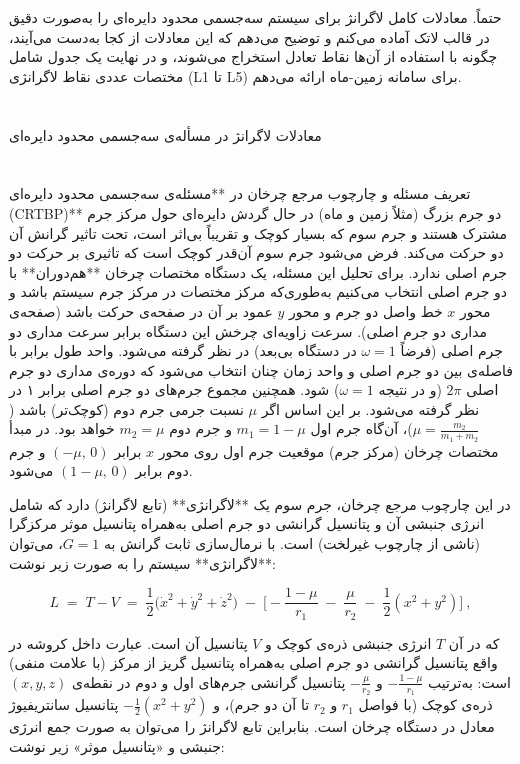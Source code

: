 حتماً. معادلات کامل لاگرانژ برای سیستم سه‌جسمی محدود دایره‌ای را به‌صورت دقیق در قالب لاتک آماده می‌کنم و توضیح می‌دهم که این معادلات از کجا به‌دست می‌آیند، چگونه با استفاده از آن‌ها نقاط تعادل استخراج می‌شوند، و در نهایت یک جدول شامل مختصات عددی نقاط لاگرانژی (L1 تا L5) برای سامانه زمین-ماه ارائه می‌دهم.

\section{} معادلات لاگرانژ در مسأله‌ی سه‌جسمی محدود دایره‌ای

\section{} تعریف مسئله و چارچوب مرجع چرخان  
در **مسئله‌ی سه‌جسمی محدود دایره‌ای (CRTBP)** دو جرم بزرگ (مثلاً زمین و ماه) در حال گردش دایره‌ای حول مرکز جرم مشترک هستند و جرم سوم که بسیار کوچک و تقریباً بی‌اثر است، تحت تاثیر گرانش آن دو حرکت می‌کند. فرض می‌شود جرم سوم آن‌قدر کوچک است که تاثیری بر حرکت دو جرم اصلی ندارد. برای تحلیل این مسئله، یک دستگاه مختصات چرخان **هم‌دوران** با دو جرم اصلی انتخاب می‌کنیم به‌طوری‌که مرکز مختصات در مرکز جرم سیستم باشد و محور $x$ خط واصل دو جرم و محور $y$ عمود بر آن در صفحه‌ی حرکت باشد (صفحه‌ی مداری دو جرم اصلی). سرعت زاویه‌ای چرخش این دستگاه برابر سرعت مداری دو جرم اصلی (فرضاً $\omega=1$ در دستگاه بی‌بعد) در نظر گرفته می‌شود. واحد طول برابر با فاصله‌ی بین دو جرم اصلی و واحد زمان چنان انتخاب می‌شود که دوره‌ی مداری دو جرم اصلی $2\pi$ (و در نتیجه $\omega=1$) شود. همچنین مجموع جرم‌های دو جرم اصلی برابر ۱ در نظر گرفته می‌شود. بر این اساس اگر $\mu$ نسبت جرمی جرم دوم (کوچک‌تر) باشد ($\mu=\frac{m_2}{m_1+m_2}$)، آن‌گاه جرم اول $m_1=1-\mu$ و جرم دوم $m_2=\mu$ خواهد بود. در مبدأ مختصات چرخان (مرکز جرم) موقعیت جرم اول روی محور $x$ برابر $(-\mu,\,0)$ و جرم دوم برابر $(1-\mu,\,0)$ می‌شود.  

در این چارچوب مرجع چرخان، جرم سوم یک **لاگرانژی** (تابع لاگرانژ) دارد که شامل انرژی جنبشی آن و پتانسیل گرانشی دو جرم اصلی به‌همراه پتانسیل موثر مرکزگرا (ناشی از چارچوب غیرلخت) است. با نرمال‌سازی ثابت گرانش به $G=1$، می‌توان **لاگرانژی** سیستم را به صورت زیر نوشت:

$$ 
L \;=\; T - V \;=\; \frac{1}{2}\Big(\dot{x}^2+\dot{y}^2+\dot{z}^2\Big)\;-\;\Bigg[-\frac{1-\mu}{r_1}\;-\;\frac{\mu}{r_2}\;-\;\frac{1}{2}(x^2+y^2)\Bigg]~, 
$$

که در آن $T$ انرژی جنبشی ذره‌ی کوچک و $V$ پتانسیل آن است. عبارت داخل کروشه در واقع پتانسیل گرانشی دو جرم اصلی به‌همراه پتانسیل گریز از مرکز (با علامت منفی) است: به‌ترتیب $-\frac{1-\mu}{r_1}$ و $-\frac{\mu}{r_2}$ پتانسیل گرانشی جرم‌های اول و دوم در نقطه‌ی $(x,y,z)$ ذره‌ی کوچک (با فواصل $r_1$ و $r_2$ تا آن دو جرم)، و $-\frac{1}{2}(x^2+y^2)$ پتانسیل سانتریفیوژ معادل در دستگاه چرخان است. بنابراین تابع لاگرانژ را می‌توان به صورت جمع انرژی جنبشی و «پتانسیل موثر» زیر نوشت:

